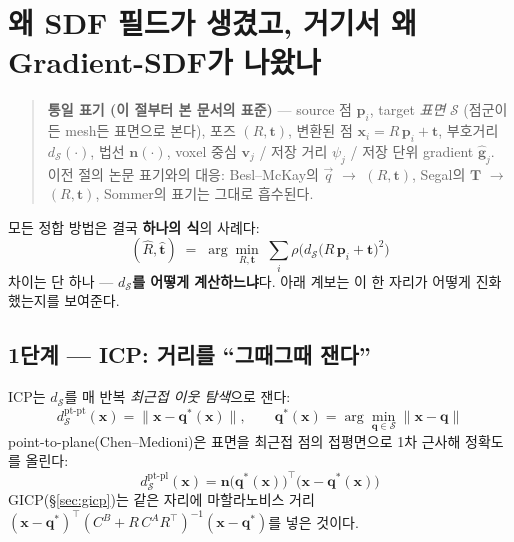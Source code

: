 \section{왜 SDF 필드가 생겼고, 거기서 왜 Gradient-SDF가 나왔나}
\label{sec:lineage}

\begin{quote}
  \small\textbf{통일 표기 (이 절부터 본 문서의 표준)} ---
  source 점 $\mathbf{p}_i$, target \emph{표면} $\mathcal{S}$ (점군이든
  mesh든 표면으로 본다), 포즈 $(R,\mathbf{t})$, 변환된 점
  $\mathbf{x}_i = R\,\mathbf{p}_i + \mathbf{t}$,
  부호거리 $d_{\mathcal{S}}(\cdot)$, 법선 $\mathbf{n}(\cdot)$,
  voxel 중심 $\mathbf{v}_j$ / 저장 거리 $\psi_j$ / 저장 단위 gradient
  $\hat{\mathbf{g}}_j$. 이전 절의 논문 표기와의 대응:
  Besl--McKay의 $\vec q$ $\to$ $(R,\mathbf{t})$, Segal의 $\mathbf{T}$
  $\to$ $(R,\mathbf{t})$, Sommer의 표기는 그대로 흡수된다.
\end{quote}

모든 정합 방법은 결국 \textbf{하나의 식}의 사례다:
\begin{equation}
  (\hat R,\hat{\mathbf{t}})
  \;=\; \arg\min_{R,\mathbf{t}}\;
  \sum_i \rho\Big( d_{\mathcal{S}}\big(R\,\mathbf{p}_i+\mathbf{t}\big)^2 \Big)
  \label{eq:master}
\end{equation}
차이는 단 하나 --- \textbf{$d_{\mathcal{S}}$를 어떻게 계산하느냐}다. 아래
계보는 이 한 자리가 어떻게 진화했는지를 보여준다.

\subsection{1단계 --- ICP: 거리를 ``그때그때 잰다''}

ICP는 $d_{\mathcal{S}}$를 매 반복 \emph{최근접 이웃 탐색}으로 잰다:
\begin{equation}
  d_{\mathcal{S}}^{\text{pt-pt}}(\mathbf{x})
  = \lVert \mathbf{x}-\mathbf{q}^*(\mathbf{x})\rVert,
  \qquad
  \mathbf{q}^*(\mathbf{x}) = \arg\min_{\mathbf{q}\in\mathcal{S}}
  \lVert \mathbf{x}-\mathbf{q}\rVert
  \label{eq:dpp}
\end{equation}
point-to-plane(Chen--Medioni)은 표면을 최근접 점의 접평면으로 1차 근사해
정확도를 올린다:
\begin{equation}
  d_{\mathcal{S}}^{\text{pt-pl}}(\mathbf{x})
  = \mathbf{n}\big(\mathbf{q}^*(\mathbf{x})\big)^{\top}
    \big(\mathbf{x}-\mathbf{q}^*(\mathbf{x})\big)
  \label{eq:dpl}
\end{equation}
GICP(\S\ref{sec:gicp})는 같은 자리에 마할라노비스 거리
$(\mathbf{x}-\mathbf{q}^*)^{\top}(C^B + R\,C^A R^{\top})^{-1}
(\mathbf{x}-\mathbf{q}^*)$를 넣은 것이다.

